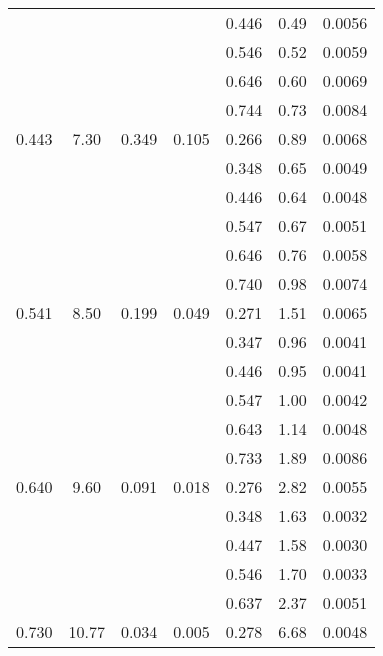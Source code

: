 \begin{table}[htbp]
\begin{center}
\begin{tabular}{|ccccc||c|c|}
         &          &          &          &    0.446 &      0.49 &    0.0056 \\
         &          &          &          &    0.546 &      0.52 &    0.0059 \\
         &          &          &          &    0.646 &      0.60 &    0.0069 \\
         &          &          &          &    0.744 &      0.73 &    0.0084 \\
   0.443 &    7.30 &   0.349 &    0.105 &    0.266 &      0.89 &    0.0068 \\
         &          &          &          &    0.348 &      0.65 &    0.0049 \\
         &          &          &          &    0.446 &      0.64 &    0.0048 \\
         &          &          &          &    0.547 &      0.67 &    0.0051 \\
         &          &          &          &    0.646 &      0.76 &    0.0058 \\
         &          &          &          &    0.740 &      0.98 &    0.0074 \\
   0.541 &    8.50 &   0.199 &    0.049 &    0.271 &      1.51 &    0.0065 \\
         &          &          &          &    0.347 &      0.96 &    0.0041 \\
         &          &          &          &    0.446 &      0.95 &    0.0041 \\
         &          &          &          &    0.547 &      1.00 &    0.0042 \\
         &          &          &          &    0.643 &      1.14 &    0.0048 \\
         &          &          &          &    0.733 &      1.89 &    0.0086 \\
   0.640 &    9.60 &   0.091 &    0.018 &    0.276 &      2.82 &    0.0055 \\
         &          &          &          &    0.348 &      1.63 &    0.0032 \\
         &          &          &          &    0.447 &      1.58 &    0.0030 \\
         &          &          &          &    0.546 &      1.70 &    0.0033 \\
         &          &          &          &    0.637 &      2.37 &    0.0051 \\
   0.730 &   10.77 &   0.034 &    0.005 &    0.278 &      6.68 &    0.0048 \\

\end{tabular}
\end{center}
\end{table}
